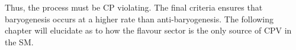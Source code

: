 Thus, the process must be CP violating.
The final criteria ensures that baryogenesis occurs at a higher rate than anti-baryogenesis.
The following chapter will elucidate as to how the flavour sector is the only source of CPV in the
SM.






